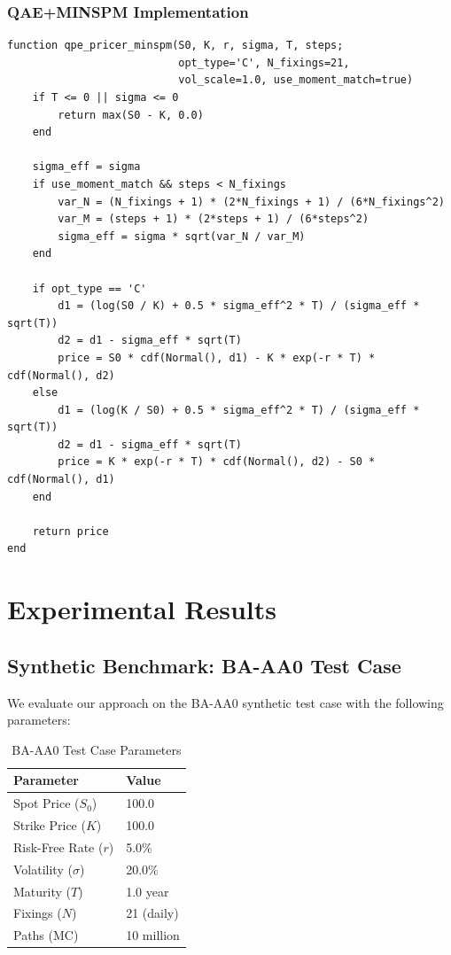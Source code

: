 \documentclass[12pt]{article}
\begin{document}
\subsubsection{QAE+MINSPM Implementation}

\begin{verbatim}
function qpe_pricer_minspm(S0, K, r, sigma, T, steps;
                           opt_type='C', N_fixings=21,
                           vol_scale=1.0, use_moment_match=true)
    if T <= 0 || sigma <= 0
        return max(S0 - K, 0.0)
    end
    
    sigma_eff = sigma
    if use_moment_match && steps < N_fixings
        var_N = (N_fixings + 1) * (2*N_fixings + 1) / (6*N_fixings^2)
        var_M = (steps + 1) * (2*steps + 1) / (6*steps^2)
        sigma_eff = sigma * sqrt(var_N / var_M)
    end
    
    if opt_type == 'C'
        d1 = (log(S0 / K) + 0.5 * sigma_eff^2 * T) / (sigma_eff * sqrt(T))
        d2 = d1 - sigma_eff * sqrt(T)
        price = S0 * cdf(Normal(), d1) - K * exp(-r * T) * cdf(Normal(), d2)
    else
        d1 = (log(K / S0) + 0.5 * sigma_eff^2 * T) / (sigma_eff * sqrt(T))
        d2 = d1 - sigma_eff * sqrt(T)
        price = K * exp(-r * T) * cdf(Normal(), d2) - S0 * cdf(Normal(), d1)
    end
    
    return price
end
\end{verbatim}

\section{Experimental Results}

\subsection{Synthetic Benchmark: BA-AA0 Test Case}

We evaluate our approach on the BA-AA0 synthetic test case with the following parameters:

\begin{table}[H]
\centering
\begin{tabular}{ll}
\toprule
Parameter & Value \\
\midrule
Spot Price ($S_0$) & 100.0 \\
Strike Price ($K$) & 100.0 \\
Risk-Free Rate ($r$) & 5.0\% \\
Volatility ($\sigma$) & 20.0\% \\
Maturity ($T$) & 1.0 year \\
Fixings ($N$) & 21 (daily) \\
Paths (MC) & 10 million \\
\bottomrule
\end{tabular}
\caption{BA-AA0 Test Case Parameters}
\end{table}
\end{document}
